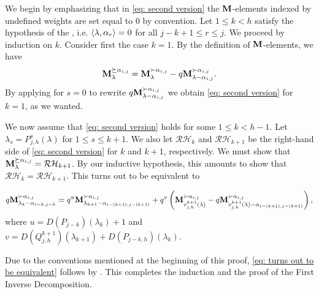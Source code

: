 \begin{myproof}
We begin by emphasizing that in \cref{eq: second version} the $\mathbf{M}$-elements indexed by undefined weights are set equal to $0$ by convention.
    Let $1\leq k< h$ satisfy the hypothesis of the , i.e. $\langle \lambda , \alpha_r \rangle=0$ for all $j-k+1\leq r \leq j$.  
    We  proceed  by  induction on $k$.
    Consider first the case $k = 1$.
    By the definition of $\mathbf{M}$-elements, we have
    \begin{equation}\label{eq: second version -1}
    \mathbf{M}_{\lambda}^{\succeq \alpha_{i,j}} = \mathbf{M}_{\lambda}^{\succ \alpha_{i,j}} - q\mathbf{M}_{\lambda-\alpha_{i,j}}^{\succ \alpha_{i,j}}.
    \end{equation}
  By applying   for $s=0$ to rewrite $q\mathbf{M}_{\lambda-\alpha_{i,j}}^{\succ \alpha_{i,j}}$ we obtain \eqref{eq: second version} for $k=1$,  as we wanted.
 
We now assume that \cref{eq: second version} holds for some $1\leq k < h-1$.
Let $\lambda_{s} = P^s_{j,h}(\lambda)$ for $1\leq s\leq k+1$. 
We also let $\mathcal{RH}_k$ and $\mathcal{RH}_{k+1}$ be the right-hand side of \eqref{eq: second version} for $k$ and $k+1$, respectively. 
We must show that $\mathbf{M}_{\lambda}^{\succeq \alpha_{i,j}}=\mathcal{RH}_{k+1}$. 
By our inductive hypothesis, this amounts to show that $\mathcal{RH}_k=\mathcal{RH}_{k+1}$. 
This turns out to be  equivalent to 


\begin{equation} \label{eq: turns out to be equivalent}
  q \mathbf{M}_{\lambda_{k} - \alpha_{i-k,j-k}}^{\succ \alpha_{i,j}} = q^{u} \mathbf{M}_{\lambda_{k+1} - \alpha_{i-(k+1),j-(k+1)}}^{\succ \alpha_{i,j}} 
  + q^{ v   }  
  \left( \mathbf{M}_{v^{k+1}_{j,h}(\lambda)}^{\succ \alpha_{i,j}} - q \mathbf{M}_{v^{k+1}_{j,h}(\lambda) - \alpha_{i-(k+1),j-(k+1)}}^{\succ \alpha_{i,j}} \right),
\end{equation}
where $u=D(P_{j-k})(\lambda_k) + 1$ and $v=D(Q^{k+1}_{j,h})(\lambda_{k+1}) +D(P_{j-k,h} )(\lambda_k)  $.

Due to the conventions mentioned at the beginning of this proof,  \cref{eq: turns out to be equivalent} follows by . 
This completes the induction and the proof of the First Inverse Decomposition.
\end{myproof}


